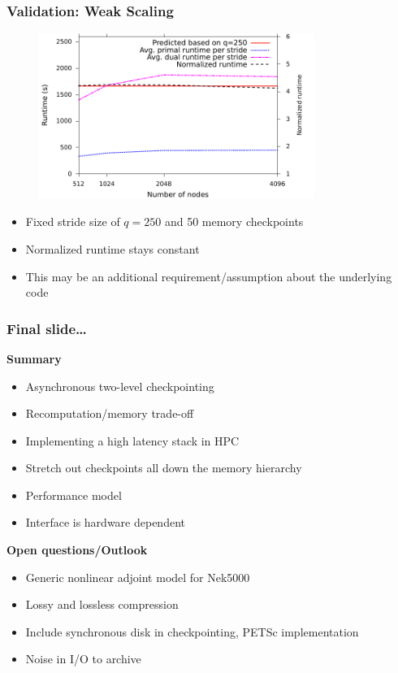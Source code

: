\begin{frame}
  \frametitle{Validation: Weak Scaling}
  \begin{figure}
    \centering
    \includegraphics[width=0.8\textwidth]{./figures/strong}
    \label{fig:revolve_strong}
  \end{figure}
  \begin{itemize}
    \item Fixed stride size of $q=250$ and 50 memory checkpoints
    \item Normalized runtime stays constant
    \item This may be an additional requirement/assumption about the underlying
      code
  \end{itemize}
\end{frame}

\begin{frame}
  \frametitle{Final slide\ldots}
 {\bf Summary}
  \begin{itemize}
    \item Asynchronous two-level checkpointing
    \item Recomputation/memory trade-off
    \item Implementing a high latency stack in HPC
    \item Stretch out checkpoints all down the memory hierarchy
    \item Performance model
    \item Interface is hardware dependent
  \end{itemize}
  
  {\bf Open questions/Outlook}
 \begin{itemize}
   \item Generic nonlinear adjoint model for Nek5000
   \item Lossy and lossless compression
   \item Include synchronous disk in checkpointing, PETSc implementation
   \item Noise in I/O to archive
 \end{itemize}
\end{frame}

